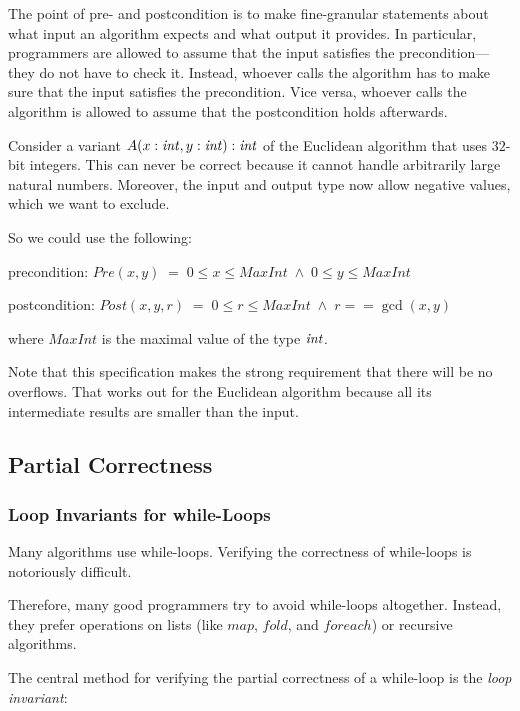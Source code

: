 The point of pre- and postcondition is to make fine-granular statements about what input an algorithm expects and what output it provides.
In particular, programmers are allowed to assume that the input satisfies the precondition---they do not have to check it.
Instead, whoever calls the algorithm has to make sure that the input satisfies the precondition.
Vice versa, whoever calls the algorithm is allowed to assume that the postcondition holds afterwards.

\begin{example}
Consider a variant $A(x:\mathit{int},y:\mathit{int}):\mathit{int}$ of the Euclidean algorithm that uses $32$-bit integers.
This can never be correct because it cannot handle arbitrarily large natural numbers.
Moreover, the input and output type now allow negative values, which we want to exclude.
 
So we could use the following:
\begin{compactitem}
\item precondition: $Pre(x,y)\;=\;0\leq x \leq MaxInt \;\wedge\; 0\leq y \leq MaxInt$
\item postcondition: $Post(x,y,r)\;=\;0\leq r\leq MaxInt\;\wedge\; r==\gcd(x,y)$
\end{compactitem}
where $MaxInt$ is the maximal value of the type $\mathit{int}$.

Note that this specification makes the strong requirement that there will be no overflows.
That works out for the Euclidean algorithm because all its intermediate results are smaller than the input.
\end{example}

\subsection{Partial Correctness}\label{sec:ad:loopinv}

\subsubsection{Loop Invariants for while-Loops}

Many algorithms use while-loops.
Verifying the correctness of while-loops is notoriously difficult.

Therefore, many good programmers try to avoid while-loops altogether.
Instead, they prefer operations on lists (like $map$, $fold$, and $foreach$) or recursive algorithms.
\medskip

The central method for verifying the partial correctness of a while-loop is the \emph{loop invariant}:

